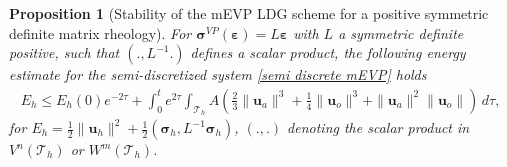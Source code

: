 \documentclass[11pt]{article}
\newtheorem{prop}{Proposition}[section]
\newcommand{\bu}{\mathbf{u}}
\newcommand{\sig}{\boldsymbol{\sigma}}
\newcommand{\beps}{\boldsymbol{\varepsilon}}
\begin{document}
\begin{prop}[Stability of the mEVP LDG scheme for a positive symmetric definite matrix rheology]\label{prop:stability}
For $\sig^{VP}(\beps) = L\beps$ with $L$ a symmetric definite positive, such that $(., L^{-1}.)$ defines a scalar product, the following energy estimate for the semi-discretized system \eqref{semi discrete mEVP} holds
    \begin{equation}
    \label{E bound}
    \begin{aligned}
E_h \leq E_h(0)e^{-2\tau} + \int_0^t e^{2\tau} \int_{\mathcal{T}_h} A\left ( \frac{2}{3}\|\bu_a\|^3 + \frac{1}{4}\|\bu_o\|^3 + \|\bu_a\|^2\|\bu_o\| \right )\,d\tau,
\end{aligned}
\end{equation}
for $E_h = \frac{1}{2}\|\bu_h\|^2 + \frac{1}{2}(\sig_h, L^{-1} \sig_h)$, $(., .)$ denoting the scalar product in $V^n(\mathcal{T}_h)$ or $W^m(\mathcal{T}_h)$.
\end{prop}
\end{document}
